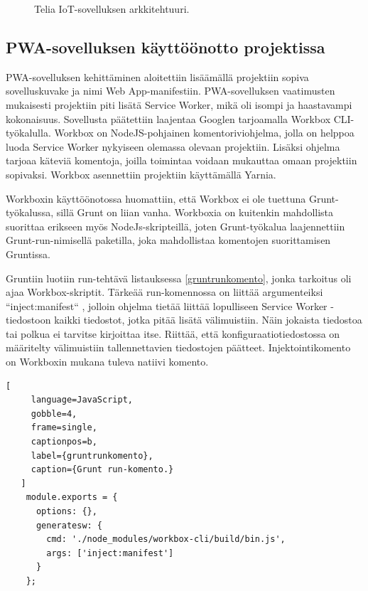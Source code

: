 \documentclass{tktltiki}
\begin{document}
\begin{figure}[h]
\begin{center}
\caption{Telia IoT-sovelluksen arkkitehtuuri.}
\label{angulararkkitehtuuri}
\end{center}
\end{figure}


\subsection{PWA-sovelluksen käyttöönotto projektissa}

PWA-sovelluksen kehittäminen aloitettiin lisäämällä projektiin sopiva sovelluskuvake ja nimi Web App-manifestiin. PWA-sovelluksen vaatimusten mukaisesti projektiin piti lisätä Service Worker, mikä oli isompi ja haastavampi kokonaisuus. Sovellusta päätettiin laajentaa Googlen tarjoamalla Workbox CLI-työkalulla. Workbox on NodeJS-pohjainen komentoriviohjelma, jolla on helppoa luoda Service Worker nykyiseen olemassa olevaan projektiin. Lisäksi ohjelma tarjoaa käteviä komentoja, joilla toimintaa voidaan mukauttaa omaan projektiin sopivaksi. Workbox asennettiin projektiin käyttämällä Yarnia.

Workboxin käyttöönotossa huomattiin, että Workbox ei ole tuettuna Grunt-työkalussa, sillä Grunt on liian vanha. Workboxia on kuitenkin mahdollista suorittaa erikseen myös NodeJs-skripteillä, joten Grunt-työkalua laajennettiin Grunt-run-nimisellä paketilla, joka mahdollistaa komentojen suorittamisen Gruntissa. 

Gruntiin luotiin run-tehtävä listauksessa \ref{gruntrunkomento}, jonka tarkoitus oli ajaa Workbox-skriptit. Tärkeää run-komennossa on liittää argumenteiksi “inject:manifest“ \cite{Googlec}, jolloin ohjelma tietää liittää lopulliseen Service Worker -tiedostoon kaikki tiedostot, jotka pitää lisätä välimuistiin. Näin jokaista tiedostoa tai polkua ei tarvitse kirjoittaa itse. Riittää, että konfiguraatiotiedostossa on määritelty välimuistiin tallennettavien tiedostojen päätteet. Injektointikomento on Workboxin mukana tuleva natiivi komento.

\begin{lstlisting}[
     language=JavaScript,
     gobble=4,
     frame=single,
     captionpos=b,
     label={gruntrunkomento},
     caption={Grunt run-komento.}
   ]
    module.exports = {
      options: {},
      generatesw: {
        cmd: './node_modules/workbox-cli/build/bin.js',
        args: ['inject:manifest']
      }
    };
\end{lstlisting}
\end{document}

